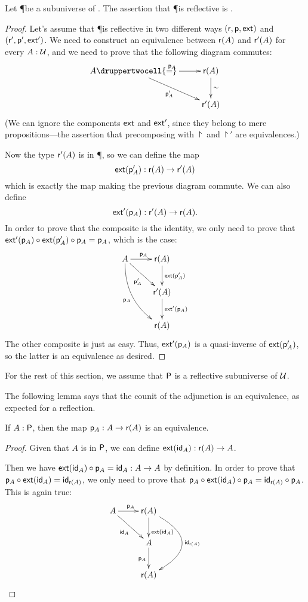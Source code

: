 \begin{lem}
  Let \P be a subuniverse of \type. The assertion that \P is reflective is \anhprop.
\end{lem}

\begin{proof}
  Let's assume that \P is reflective in two different ways
  $(\reflect,\project,\ext)$ and $(\reflect',\project',\ext')$. We need to
  construct an equivalence between $\reflect(A)$ and $\reflect'(A)$ for every
  $A:\type$, and we need to prove that the following diagram commutes:
  \[\uppercurveobject{{ }}\lowercurveobject{{ }}\twocellhead{{ }}
  \xymatrix{A \ar^{\project_A}[r] \ar_{\project'_A}[rd] \druppertwocell{=} &
    \reflect(A) \ar@{->}^\sim[d] \\
    & \reflect'(A)}\]
  (We can ignore the components $\ext$ and $\ext'$, since they belong to mere propositions---the assertion that precomposing with $\project$
and $\project'$ are equivalences.)

  Now the type $\reflect'(A)$ is in \P, so we can define the map
  \[\ext(\project'_A):\reflect(A)\to\reflect'(A)\]
  which is exactly the map making the previous diagram commute.
  We can also define
  \[\ext'(\project_A):\reflect'(A)\to\reflect(A).\]
  In order to prove that the composite is the identity, we only need to prove
  that $\ext'(\project_A)\circ\ext(\project'_A)\circ\project_A=\project_A$,
  which is the case:
  \[\uppercurveobject{{ }}\lowercurveobject{{ }}\twocellhead{{ }}
  \xymatrix{A \ar^{\project_A}[r] \ar_{\project'_A}[rd]
    \ar@/_5mm/_{\project_A}[rdd] &
    \reflect(A) \ar@{->}^{\ext(\project'_A)}[d] \\
    & \reflect'(A) \ar@{->}^{\ext'(\project_A)}[d] \\
    & \reflect(A)}\]
  The other composite is just as easy.
  Thus, $\ext'(\project_A)$ is a quasi-inverse of $\ext(\project'_A)$, so the latter is an equivalence as desired.
\end{proof}

For the rest of this section, we assume that $\P$ is a reflective subuniverse of
$\type$.

The following lemma says that the counit of the adjunction is an equivalence, as expected for a reflection.
\begin{lem}
  \label{reflectPequiv}
  If $A:\P$, then the map $\project_A:A\to\reflect(A)$ is an equivalence.
\end{lem}
\begin{proof}
  Given that $A$ is in $\P$, we can define $\ext(\idfunc[A]):\reflect(A)\to{}A$.

  Then we have $\ext(\idfunc[A])\circ\project_A=\idfunc[A]:A\to{}A$ by
  definition.  In order to prove that
  $\project_A\circ\ext(\idfunc[A])=\idfunc[\reflect(A)]$, we only need to prove
  that $\project_A\circ\ext(\idfunc[A])\circ\project_A=
  \idfunc[\reflect(A)]\circ\project_A$.
  This is again true:
  \[\xymatrix{
    A \ar^{\project_A}[r] \ar_{\idfunc[A]}[rd] &
    \reflect(A) \ar^>>>{\ext(\idfunc[A])}[d] \ar@/^40pt/^{\idfunc[\reflect(A)]}[dd] \\
    & A \ar_{\project_A}[d] \\
    & \reflect(A)}\]
\end{proof}

